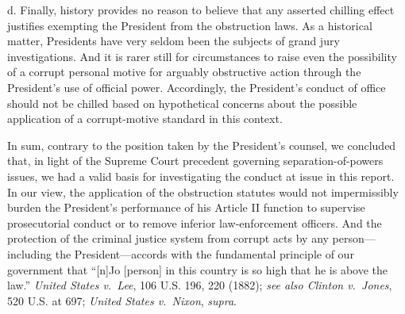 d. Finally, history provides no reason to believe that any asserted chilling effect justifies exempting the President from the obstruction laws.
As a historical matter, Presidents have very seldom been the subjects of grand jury investigations.
And it is rarer still for circumstances to raise even the possibility of a corrupt personal motive for arguably obstructive action through the President's use of official power.
Accordingly, the President's conduct of office should not be chilled based on hypothetical concerns about the possible application of a corrupt-motive standard in this context.

\hr

In sum, contrary to the position taken by the President's counsel, we concluded that, in light of the Supreme Court precedent governing separation-of-powers issues, we had a valid basis for investigating the conduct at issue in this report.
In our view, the application of the obstruction statutes would not impermissibly burden the President's performance of his Article II function to supervise prosecutorial conduct or to remove inferior law-enforcement officers.
And the protection of the criminal justice system from corrupt acts by any person---including the President---accords with the fundamental principle of our government that ``[n]Jo [person] in this country is so high that he is above the law.''
\textit{United States v.\ Lee}, 106 U.S. 196, 220 (1882);
\textit{see also Clinton v.\ Jones}, 520 U.S. at 697;
\textit{United States v.\ Nixon}, \textit{supra}.
